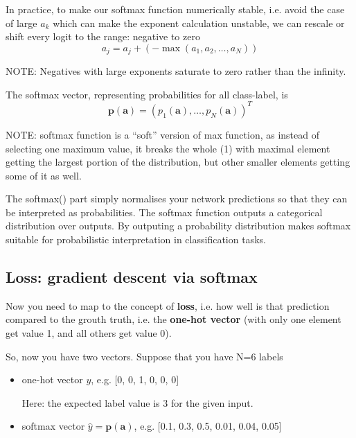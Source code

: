 \begin{mdframed}

In practice, to make our softmax function numerically stable, i.e. avoid the
case of large $a_k$ which can make the exponent calculation unstable, we can
rescale or shift every logit to the range: negative to zero
\begin{equation}
a_j = a_j + (- \max(a_1, a_2, \ldots, a_N))
\end{equation}

NOTE: Negatives with large exponents saturate to zero rather than the infinity.


\end{mdframed}

The softmax vector, representing probabilities for all class-label, is
\begin{equation}
\mathbf{p(a)} = (p_1(\mathbf{a}), \ldots, p_N(\mathbf{a}))^T
\end{equation}

\begin{mdframed}


NOTE: softmax function is a “soft” version of max function, as instead of
selecting one maximum value, it breaks the whole (1) with maximal element
getting the largest portion of the distribution, but other smaller elements
getting some of it as well.

The softmax() part simply normalises your network predictions so that they can
be interpreted as probabilities. The softmax function outputs a categorical
distribution over outputs. By outputing a probability distribution makes softmax
suitable for probabilistic interpretation in classification tasks.

\end{mdframed}

\subsection{Loss: gradient descent via softmax}
\label{sec:loss-DNN-softmax}

Now you need to map to the concept of {\bf loss}, i.e. how well is that
prediction compared to the grouth truth, i.e. the {\bf one-hot vector} (with
only one element get value 1, and all others get value 0).

So, now you have two vectors. Suppose that you have N=6 labels
\begin{itemize}
  \item one-hot vector $y$, e.g. [0, 0, 1, 0, 0, 0]
  
   Here: the expected label value is 3 for the given input.
   
  \item softmax vector $\hat{y}=\mathbf{p(a)}$, e.g. [0.1, 0.3, 0.5, 0.01, 0.04, 0.05]
\end{itemize}

